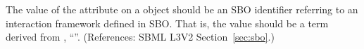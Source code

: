The value of the attribute  on a \Model object should be an
SBO identifier referring to an interaction framework defined in SBO.  That
is, the value should be a term derived from \sbointeractionID,
``''.  (References: SBML L3V2 Section~\ref{sec:sbo}.)
